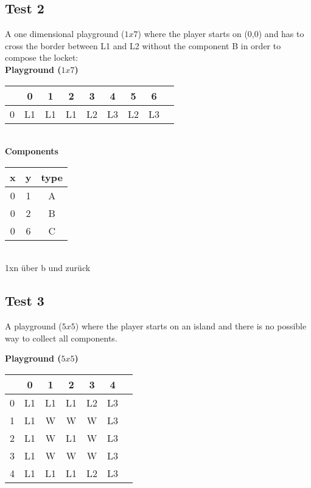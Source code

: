 \documentclass{article}
\begin{document}
\subsection{Test 2}
A one dimensional playground ($1 x 7$) where the player starts on (0,0) and has to cross the border between L1 and L2 without the component B in order to compose the locket:\\ 

\textbf{Playground ($1 x 7$)}

\begin{tabular}{ |c|c|c|c|c|c|c|c|c| } 
 \hline
 & 0 & 1 & 2 & 3 & 4 & 5 & 6 \\ 
 \hline
 0 & L1 & L1 & L1 & L2 & L3 & L2 & L3 \\ 
 \hline
\end{tabular}
\\


\textbf{Components}

\begin{tabular}{ |c|c|c| } 
 \hline
 x & y & type  \\ 
 \hline
 0 & 1 & A \\
 0 & 2 & B \\
 0 & 6 & C \\ 
 \hline
\end{tabular}
\\


1xn über b und zurück


\subsection{Test 3}
A  playground ($5 x 5$) where the player starts on an island and there is no possible way to collect all components.

\textbf{Playground ($5 x 5$)}

\begin{tabular}{ |c|c|c|c|c|c|c| } 
 \hline
 & 0 & 1 & 2 & 3 & 4  \\ 
 \hline
 0 & L1 & L1 & L1 & L2 & L3 \\ 
 \hline
 1 & L1 & W & W & W & L3 \\ 
 \hline
 2 & L1 & W & L1 & W & L3 \\ 
 \hline
 3 & L1 & W & W & W & L3 \\ 
 \hline
 4 & L1 & L1 & L1 & L2 & L3 \\ 
 \hline
\end{tabular}
\\
\end{document}

